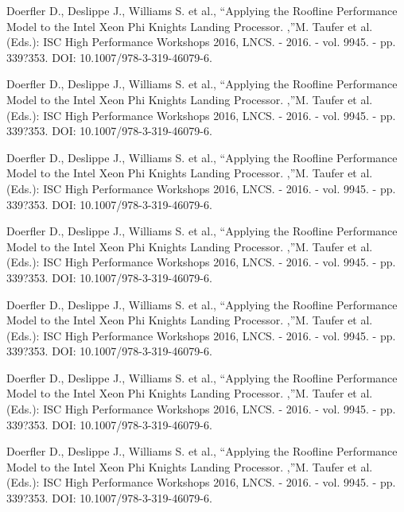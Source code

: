 \documentclass[
11pt,%
tightenlines,%
twoside,%
onecolumn,%
nofloats,%
nobibnotes,%
nofootinbib,%
superscriptaddress,%
noshowpacs,%
centertags]%
{revtex4}
\begin{document}
\begin{thebibliography}{99}
Doerfler D., Deslippe J., Williams S. et al., \textquotedblleft Applying the Roofline Performance Model to the Intel Xeon Phi Knights Landing Processor. ,\textquotedblright M. Taufer et al. (Eds.): ISC High Performance Workshops 2016, LNCS. - 2016. - vol. 9945. - pp. 339?353. DOI: 10.1007/978-3-319-46079-6.

Doerfler D., Deslippe J., Williams S. et al., \textquotedblleft Applying the Roofline Performance Model to the Intel Xeon Phi Knights Landing Processor. ,\textquotedblright M. Taufer et al. (Eds.): ISC High Performance Workshops 2016, LNCS. - 2016. - vol. 9945. - pp. 339?353. DOI: 10.1007/978-3-319-46079-6.

Doerfler D., Deslippe J., Williams S. et al., \textquotedblleft Applying the Roofline Performance Model to the Intel Xeon Phi Knights Landing Processor. ,\textquotedblright M. Taufer et al. (Eds.): ISC High Performance Workshops 2016, LNCS. - 2016. - vol. 9945. - pp. 339?353. DOI: 10.1007/978-3-319-46079-6.

Doerfler D., Deslippe J., Williams S. et al., \textquotedblleft Applying the Roofline Performance Model to the Intel Xeon Phi Knights Landing Processor. ,\textquotedblright M. Taufer et al. (Eds.): ISC High Performance Workshops 2016, LNCS. - 2016. - vol. 9945. - pp. 339?353. DOI: 10.1007/978-3-319-46079-6.

Doerfler D., Deslippe J., Williams S. et al., \textquotedblleft Applying the Roofline Performance Model to the Intel Xeon Phi Knights Landing Processor. ,\textquotedblright M. Taufer et al. (Eds.): ISC High Performance Workshops 2016, LNCS. - 2016. - vol. 9945. - pp. 339?353. DOI: 10.1007/978-3-319-46079-6.

Doerfler D., Deslippe J., Williams S. et al., \textquotedblleft Applying the Roofline Performance Model to the Intel Xeon Phi Knights Landing Processor. ,\textquotedblright M. Taufer et al. (Eds.): ISC High Performance Workshops 2016, LNCS. - 2016. - vol. 9945. - pp. 339?353. DOI: 10.1007/978-3-319-46079-6.

Doerfler D., Deslippe J., Williams S. et al., \textquotedblleft Applying the Roofline Performance Model to the Intel Xeon Phi Knights Landing Processor. ,\textquotedblright M. Taufer et al. (Eds.): ISC High Performance Workshops 2016, LNCS. - 2016. - vol. 9945. - pp. 339?353. DOI: 10.1007/978-3-319-46079-6.


\end{thebibliography}
\end{document}
